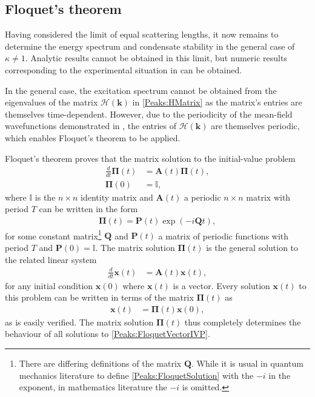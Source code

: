 \subsection[Floquet's theorem]{Floquet's theorem \citep{AppliedNonlinearDynamics:1995}}
\label{Peaks:FloquetsTheorem}

Having considered the limit of equal scattering lengths, it now remains to determine the energy spectrum and condensate stability in the general case of $\kappa \neq 1$. Analytic results cannot be obtained in this limit, but numeric results corresponding to the experimental situation in  can be obtained.

In the general case, the excitation spectrum cannot be obtained from the eigenvalues of the matrix $\mathcal{H}(\bm{k})$ in \eqref{Peaks:HMatrix} as the matrix's entries are  themselves time-dependent. However, due to the periodicity of the mean-field wavefunctions demonstrated in , the entries of $\mathcal{H}(\bm{k})$ are themselves periodic, which enables Floquet's theorem to be applied.

Floquet's theorem proves that the matrix solution to the initial-value problem
\begin{subequations}
    \label{Peaks:FloquetMatrixIVP}
    \begin{align}
        \frac{d}{dt}\bm{\Pi}(t) &= \bm{A}(t) \bm{\Pi}(t),\\
        \bm{\Pi}(0) &= \mathbb{I},
    \end{align}
\end{subequations}
where $\mathbb{I}$ is the $n \times n$ identity matrix and $\bm{A}(t)$ a periodic $n \times n$ matrix with period $T$ can be written in the form
\begin{align}
    \bm{\Pi}(t) = \bm{P}(t) \exp(-i\bm{Q} t),
    \label{Peaks:FloquetSolution}
\end{align}
for some constant matrix\footnote{There are differing definitions of the matrix $\bm{Q}$. While it is usual in quantum mechanics literature \citep{Shirley:1965,Hanggi:1998,Garrison:1999} to define \eqref{Peaks:FloquetSolution} with the $-i$ in the exponent,  in mathematics literature \citep{Moulton:1958,AppliedNonlinearDynamics:1995} the $-i$ is omitted.} $\bm{Q}$ and $\bm{P}(t)$ a matrix of periodic functions with period $T$ and $\bm{P}(0) = \mathbb{I}$. The matrix solution $\bm{\Pi}(t)$ is the general solution to the related linear system
\begin{align}
    \frac{d}{dt}\bm{x}(t) &= \bm{A}(t) \bm{x}(t),
    \label{Peaks:FloquetVectorIVP}
\end{align}
for any initial condition $\bm{x}(0)$ where $\bm{x}(t)$ is a vector. Every solution $\bm{x}(t)$ to this problem can be written in terms of the matrix $\bm{\Pi}(t)$ as
\begin{align}
    \bm{x}(t) &= \bm{\Pi}(t) \bm{x}(0),
\end{align}
as is easily verified. The matrix solution $\bm{\Pi}(t)$ thus completely determines the behaviour of all solutions to \eqref{Peaks:FloquetVectorIVP}.

